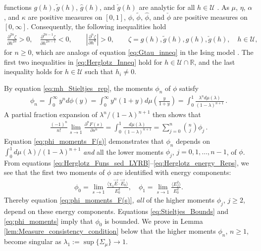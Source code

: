 \documentclass[english,12pt,jmp,graphicx]{revtex4-1}
\newcommand{\ph}{\hat{\phi}}
\begin{document}
functions $g(h),\tilde{g}(h)$, $\hat{g}(h)$, and $\check{g}(h)$ are
analytic for all $h\in\mathcal{U}$ \cite{Golden:CMP-473}.  As $\mu$, $\eta$,
$\alpha$, and $\kappa$ are positive measures on $[0,1]$, $\phi$, $\tilde{\phi}$,
$\ph$, and $\check{\phi}$ are positive measures on $[0,\infty]$. Consequently,
the following inequalities hold 
%
\begin{align}\label{eq:Herglotz_Inneq}
  \frac{\partial^{2n}\zeta}{\partial h^{2n}}>0, \quad
  \frac{\partial^{2n-1}\zeta}{\partial h^{2n-1}}<0, \qquad
  \left|\frac{\partial^n\zeta}{\partial h^n}\right|>0, \qquad
  \zeta=g(h),\tilde{g}(h),\hat{g}(h),\check{g}(h), \quad h\in\mathcal{U},
\end{align}
%
for $n\geq0$, which are analogs of equation \eqref{eq:Gtau_inneq} in the
Ising model \cite{Golden:JMP-5627}. The first two inequalities in
\eqref{eq:Herglotz_Inneq} hold for $h\in\mathcal{U}\cap\mathbb{R}$, and the
last inequality holds for $h\in\mathcal{U}$ such that $h_i\neq0$. 

By equation \eqref{eq:mh_Stieltjes_rep}, the moments $\phi_n$ of $\phi$
satisfy  
%
\begin{align}\label{eq:phi_moments}
  \phi_n=\int_0^\infty y^nd\phi(y)
    =\int_0^\infty y^n(1+y)d\mu\left(\frac{y}{1+y}\right)
    =\int_0^1\frac{\lambda^nd\mu(\lambda)}{(1-\lambda)^{n+1}}\,.
\end{align}
%
A partial fraction expansion of $\lambda^n/(1-\lambda)^{n+1}$ then shows that
%
\begin{align}\label{eq:phi_moments_F(s)}
  \frac{(-1)^n}{n!}\lim_{s\to1}\frac{\partial^nF(s)}{\partial s^n}=\int_0^1\frac{d\mu(\lambda)}{(1-\lambda)^{n+1}}
                                =\sum_{j=0}^n{n \choose j} \phi_j\,.
\end{align}
%
Equation \eqref{eq:phi_moments_F(s)} demonstrates that $\phi_n$ depends
on $\int_0^1d\mu(\lambda)/(1-\lambda)^{n+1}$ \emph{and} all the lower moments $\phi_j$,
$j=0,1,\ldots,n-1$, of $\phi$. From equations 
\eqref{eq:Herglotz_Funs_sed_LYRB}--\eqref{eq:Herglotz_energy_Reps}, we  
see that the first two moments of $\phi$ are identified with energy
components:     
%
\begin{align}\label{eq:phi_energy_relations}
  \phi_0=\lim_{s\to1}\frac{\langle\chi_1\vec{E}\cdot\vec{E}_0\rangle}{E_0^2},   \quad
  \phi_1=\lim_{s\to1}\frac{\langle E_f^2\rangle}{E_0^2}.
\end{align}
%
Thereby equation \eqref{eq:phi_moments_F(s)}, \emph{all} of the higher
moments $\phi_j$, $j\geq2$, depend on these energy components. Equations
\eqref{eq:Stieltjes_Bounds} and \eqref{eq:phi_moments} imply that
$\phi_0$ is bounded. We prove in Lemma
\ref{lem:Measure_consistency_condition} below that the higher moments
$\phi_n$, $n\geq1$, become singular as $\lambda_1:=\sup\{\Sigma_\mu\}\to1$.
\end{document}
